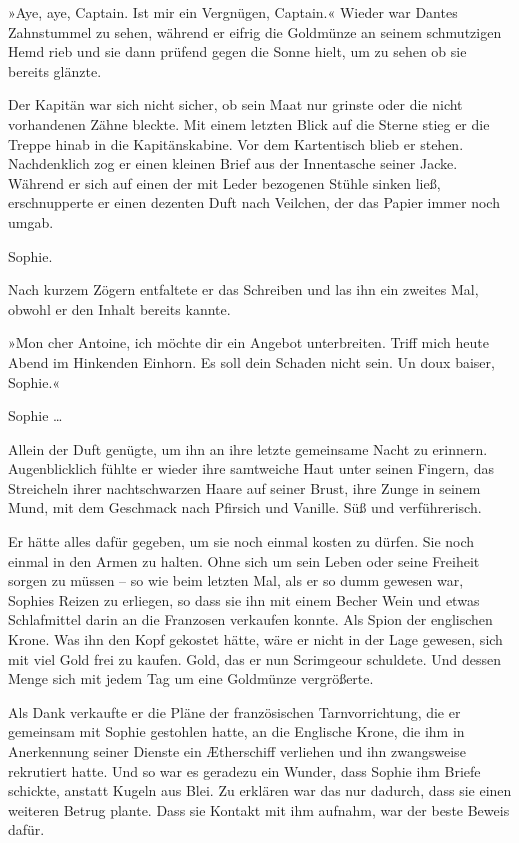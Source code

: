 »Aye, aye, Captain. Ist mir ein Vergnügen, Captain.« Wieder war
Dantes Zahnstummel zu sehen, während er eifrig die Goldmünze an
seinem schmutzigen Hemd rieb und sie dann prüfend gegen die Sonne
hielt, um zu sehen ob sie bereits glänzte.

Der Kapitän war sich nicht sicher, ob sein Maat nur grinste oder
die nicht vorhandenen Zähne bleckte. Mit einem letzten Blick auf
die Sterne stieg er die Treppe hinab in die Kapitänskabine. Vor dem
Kartentisch blieb er stehen. Nachdenklich zog er einen kleinen
Brief aus der Innentasche seiner Jacke. Während er sich auf einen
der mit Leder bezogenen Stühle sinken ließ, erschnupperte er einen
dezenten Duft nach Veilchen, der das Papier immer noch umgab.

Sophie.

Nach kurzem Zögern entfaltete er das Schreiben und las ihn ein
zweites Mal, obwohl er den Inhalt bereits kannte.

»Mon cher Antoine, ich möchte dir ein Angebot unterbreiten. Triff
mich heute Abend im Hinkenden Einhorn. Es soll dein Schaden nicht
sein. Un doux baiser, Sophie.«

\bigpar

Sophie …

\bigpar

Allein der Duft genügte, um ihn an ihre letzte gemeinsame Nacht zu
erinnern. Augenblicklich fühlte er wieder ihre samtweiche Haut
unter seinen Fingern, das Streicheln ihrer nachtschwarzen Haare auf
seiner Brust, ihre Zunge in seinem Mund, mit dem Geschmack nach
Pfirsich und Vanille. Süß und verführerisch.

Er hätte alles dafür gegeben, um sie noch einmal kosten zu dürfen.
Sie noch einmal in den Armen zu halten. Ohne sich um sein Leben
oder seine Freiheit sorgen zu müssen – so wie beim letzten Mal, als
er so dumm gewesen war, Sophies Reizen zu erliegen, so dass sie ihn
mit einem Becher Wein und etwas Schlafmittel darin an die Franzosen
verkaufen konnte. Als Spion der englischen Krone. Was ihn den Kopf
gekostet hätte, wäre er nicht in der Lage gewesen, sich mit viel
Gold frei zu kaufen. Gold, das er nun Scrimgeour schuldete. Und
dessen Menge sich mit jedem Tag um eine Goldmünze vergrößerte.

Als Dank verkaufte er die Pläne der französischen Tarnvorrichtung,
die er gemeinsam mit Sophie gestohlen hatte, an die Englische
Krone, die ihm in Anerkennung seiner Dienste ein Ætherschiff
verliehen und ihn zwangsweise rekrutiert hatte. Und so war es
geradezu ein Wunder, dass Sophie ihm Briefe schickte, anstatt
Kugeln aus Blei. Zu erklären war das nur dadurch, dass sie einen
weiteren Betrug plante. Dass sie Kontakt mit ihm aufnahm, war der
beste Beweis dafür.

